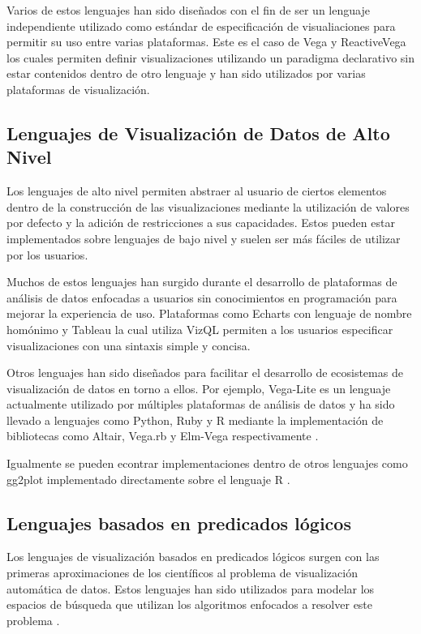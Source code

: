 Varios de estos lenguajes han sido dise\~nados con el fin de ser un lenguaje independiente utilizado como est\'andar
de especificaci\'on de visualiaciones para permitir su uso entre varias plataformas. Este es el caso de
Vega \cite{vegaLang} y ReactiveVega \cite{satyanarayan2015reactive} los cuales permiten definir visualizaciones utilizando
un paradigma declarativo sin estar contenidos dentro de otro lenguaje y han sido utilizados por varias plataformas de
visualizaci\'on.

\subsection{Lenguajes de Visualizaci\'on de Datos de Alto Nivel}
Los lenguajes de alto nivel permiten abstraer al usuario de ciertos elementos dentro de la construcci\'on
de las visualizaciones mediante la utilizaci\'on de valores por defecto y la adici\'on de restricciones a sus capacidades. Estos pueden
estar implementados sobre lenguajes de bajo nivel y suelen ser m\'as f\'aciles de utilizar por los usuarios.

Muchos de estos lenguajes han surgido durante el desarrollo de plataformas
de an\'alisis de datos enfocadas a usuarios sin conocimientos en programaci\'on para mejorar la experiencia de uso. 
Plataformas como Echarts con lenguaje de nombre hom\'onimo \cite{li2018echarts} y Tableau la cual utiliza VizQL \cite{hanrahan2006vizql}
permiten a los usuarios especificar visualizaciones con una sintaxis simple y concisa.

Otros lenguajes han sido dise\~nados para facilitar el desarrollo de ecosistemas de
visualizaci\'on de datos en torno a ellos. Por ejemplo, Vega-Lite \cite{satyanarayan2016vega} es un lenguaje actualmente utilizado
por m\'ultiples plataformas de an\'alisis de datos y ha sido llevado a lenguajes como Python, Ruby y R mediante
la implementaci\'on de bibliotecas como Altair, Vega.rb y Elm-Vega respectivamente \cite{vegaEco}.

Igualmente se pueden econtrar implementaciones dentro de otros lenguajes como gg2plot implementado
directamente sobre el lenguaje R \cite{wickham2010layered}.

\subsection{Lenguajes basados en predicados l\'ogicos}

Los lenguajes de visualizaci\'on basados en predicados l\'ogicos surgen
con las primeras aproximaciones de los cient\'ificos al problema de visualizaci\'on autom\'atica de
datos. Estos lenguajes han sido utilizados para modelar los espacios de b\'usqueda que utilizan los algoritmos
enfocados a resolver este problema \cite{godfrey2016interactive}.


